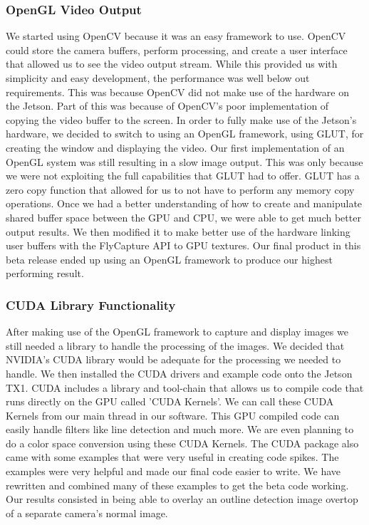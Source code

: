 \documentclass[letterpaper,10pt,titlepage]{IEEEtran}
\begin{document}
   \subsubsection{OpenGL Video Output}
	We started using OpenCV because it was an easy framework to use. OpenCV could store the camera buffers, perform processing, and create a user interface that allowed us to see the video output stream. While this provided us with simplicity and easy development, the performance was well below out requirements. This was because OpenCV did not make use of the hardware on the Jetson. Part of this was because of OpenCV's poor implementation of copying the video buffer to the screen. In order to fully make use of the Jetson's hardware, we decided to switch to using an OpenGL framework, using GLUT, for creating the window and displaying the video. Our first implementation of an OpenGL system was still resulting in a slow image output. This was only because we were not exploiting the full capabilities that GLUT had to offer. GLUT has a zero copy function that allowed for us to not have to perform any memory copy operations. Once we had a better understanding of how to create and manipulate shared buffer space between the GPU and CPU, we were able to get much better output results. We then modified it to make better use of the hardware linking user buffers with the FlyCapture API to GPU textures. Our final product in this beta release ended up using an OpenGL framework to produce our highest performing result.\\

  \subsubsection{CUDA Library Functionality}
   After making use of the OpenGL framework to capture and display images we still needed a library to handle the processing of the images. We decided that NVIDIA's CUDA library would be adequate for the processing we needed to handle. We then installed the CUDA drivers and example code onto the Jetson TX1. CUDA includes a library and tool-chain that allows us to compile code that runs directly on the GPU called 'CUDA Kernels'. We can call these CUDA Kernels from our main thread in our software. This GPU compiled code can easily handle filters like line detection and much more. We are even planning to do a color space conversion using these CUDA Kernels. The CUDA package also came with some examples that were very useful in creating code spikes. The examples were very helpful and made our final code easier to write. We have rewritten and combined many of these examples to get the beta code working. Our results consisted in being able to overlay an outline detection image overtop of a separate camera's normal image.\\
\end{document}
